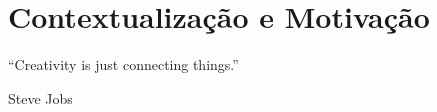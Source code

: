 \chapter{Contextualização e Motivação}

\begin{flushright}
	\begin{quotebox50}
		\large
		“Creativity is just connecting things.”

		\tcblower
		Steve Jobs
	\end{quotebox50}
\end{flushright}








